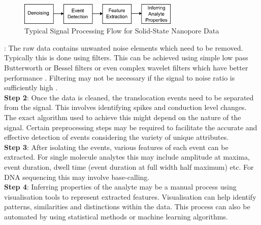 \documentclass[journal]{IEEEtran}
\begin{document}
\begin{figure}[!t]
\centering
\includegraphics[width=3in]{imgs/TypSigFlow.png}
\caption{Typical Signal Processing Flow for Solid-State Nanopore Data}
\label{fig_1}
\end{figure}

: The raw data contains unwanted noise elements which need to be removed. Typically this is done using filters. This can be achieved using simple low pass Butterworth or Bessel filters or even complex wavelet filters which have better performance \cite{shekarWaveletDenoisingHighBandwidth2019}. Filtering may not be necessary if the signal to noise ratio is sufficiently high \cite{wenGuideSignalProcessing2021}. \\
{\bf{Step 2}}: Once the data is cleaned, the translocation events need to be separated from the signal. This involves identifying spikes and conduction level changes. The exact algorithm used to achieve this might depend on the nature of the signal. Certain preprocessing steps may be required to facilitate the accurate and effective detection of events considering the variety of unique attributes. \\
{\bf{Step 3}}: After isolating the events, various features of each event can be extracted. For single molecule analytes this may include amplitude at maxima, event duration, dwell time (event duration at full width half maximum) etc. For DNA sequencing this may involve base-calling. \\
{\bf{Step 4}}: Inferring properties of the analyte may be a manual process using visualisation tools to represent extracted features. Visualisation can help identify patterns, similarities and distinctions within the data. This process can also be automated by using statistical methods or machine learning algorithms.
\end{document}
